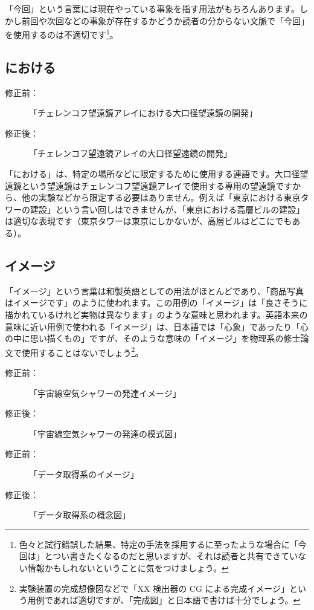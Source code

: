 「今回」という言葉には現在やっている事象を指す用法がもちろんあります。しかし前回や次回などの事象が存在するかどうか読者の分からない文脈で「今回」を使用するのは不適切です\footnote{色々と試行錯誤した結果、特定の手法を採用するに至ったような場合に「今回は」とつい書きたくなるのだと思いますが、それは読者と共有できていない情報かもしれないということに気をつけましょう。}。

\subsection{における}

\begin{description}
\item[修正前：]「チェレンコフ望遠鏡アレイにおける大口径望遠鏡の開発」
\item[修正後：]「チェレンコフ望遠鏡アレイの大口径望遠鏡の開発」
\end{description}

「における」は、特定の場所などに限定するために使用する連語です。大口径望遠鏡という望遠鏡はチェレンコフ望遠鏡アレイで使用する専用の望遠鏡ですから、他の実験などから限定する必要はありません。例えば「東京における東京タワーの建設」という言い回しはできませんが、「東京における高層ビルの建設」は適切な表現です（東京タワーは東京にしかないが、高層ビルはどこにでもある）。

\subsection{イメージ}

「イメージ」という言葉は和製英語としての用法がほとんどであり、「商品写真はイメージです」のように使われます。この用例の「イメージ」は「良さそうに描かれているけれど実物は異なります」のような意味と思われます。英語本来の意味に近い用例で使われる「イメージ」は、日本語では「心象」であったり「心の中に思い描くもの」ですが、そのような意味の「イメージ」を物理系の修士論文で使用することはないでしょう\footnote{実験装置の完成想像図などで「XX 検出器の CG による完成イメージ」という用例であれば適切ですが、「完成図」と日本語で書けば十分でしょう。}。

\begin{description}
\item[修正前：]「宇宙線空気シャワーの発達イメージ」
\item[修正後：]「宇宙線空気シャワーの発達の模式図」
\end{description}

\begin{description}
\item[修正前：]「データ取得系のイメージ」
\item[修正後：]「データ取得系の概念図」
\end{description}

